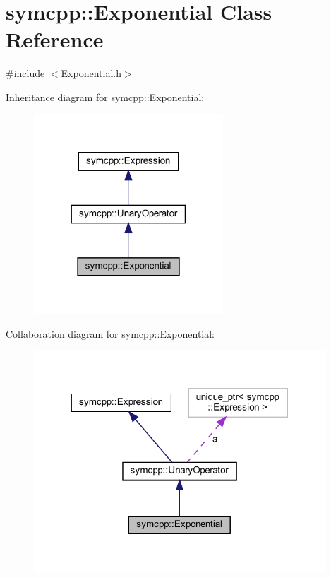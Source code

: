 \hypertarget{classsymcpp_1_1Exponential}{}\section{symcpp\+::Exponential Class Reference}
\label{classsymcpp_1_1Exponential}


{\ttfamily \#include $<$Exponential.\+h$>$}



Inheritance diagram for symcpp\+::Exponential\+:
\nopagebreak
\begin{figure}[H]
\begin{center}
\leavevmode
\includegraphics[width=201pt]{classsymcpp_1_1Exponential__inherit__graph}
\end{center}
\end{figure}


Collaboration diagram for symcpp\+::Exponential\+:
\nopagebreak
\begin{figure}[H]
\begin{center}
\leavevmode
\includegraphics[width=310pt]{classsymcpp_1_1Exponential__coll__graph}
\end{center}
\end{figure}

